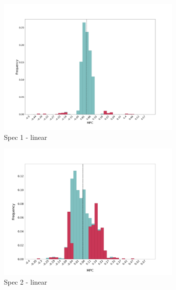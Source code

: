 \begin{figure}[t]
    \centering
    \begin{subfigure}{0.33\linewidth}
        \includegraphics[width=\linewidth]{figures/distributions/spec1_lin_chFDexp.png}
        \caption{Spec 1 - linear}
    \end{subfigure}\hfill
    \begin{subfigure}{0.33\linewidth}
        \includegraphics[width=\linewidth]{figures/distributions/spec2_lin_chFDexp.png}
        \caption{Spec 2 - linear}
    \end{subfigure}\hfill
    \begin{subfigure}{0.33\linewidth}

\end{subfigure}
\end{figure}
